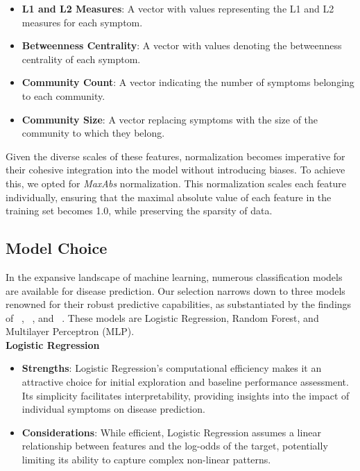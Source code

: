 \begin{itemize}
	\setlength\itemsep{1em} %
	\item \textbf{L1 and L2 Measures}: A vector with values representing the L1 and L2 measures for each symptom.
	\item \textbf{Betweenness Centrality}: A vector with values denoting the betweenness centrality of each symptom.
	\item \textbf{Community Count}: A vector indicating the number of symptoms belonging to each community.
	\item \textbf{Community Size}: A vector replacing symptoms with the size of the community to which they belong.
\end{itemize}
\noindent
Given the diverse scales of these features, normalization becomes imperative for their cohesive integration into the model
without introducing biases. To achieve this, we opted for \textit{MaxAbs} normalization. This normalization scales each feature
individually, ensuring that the maximal absolute value of each feature in the training set becomes 1.0, while preserving the sparsity of data.



\subsection{Model Choice}

In the expansive landscape of machine learning, numerous classification models are available for disease prediction.
Our selection narrows down to three models renowned for their robust predictive capabilities,
as substantiated by the findings of \citeauthor{Kohli}~\cite{Kohli}, \citeauthor{Singh}~\cite{Singh}, and \citeauthor{Uddin2019Dec}~\cite{Uddin2019Dec}.
These models are Logistic Regression, Random Forest, and Multilayer Perceptron (MLP).\\


\noindent
\textbf{Logistic Regression}\vspace{0.15cm}
\begin{itemize}
	\item \textbf{Strengths}: Logistic Regression's computational efficiency makes it an attractive choice for initial exploration and
	      baseline performance assessment. Its simplicity facilitates interpretability, providing insights into the impact of individual symptoms on disease prediction.
	\item \textbf{Considerations}: While efficient, Logistic Regression assumes a linear relationship between features and the
	      log-odds of the target, potentially limiting its ability to capture complex non-linear patterns.
\end{itemize}

